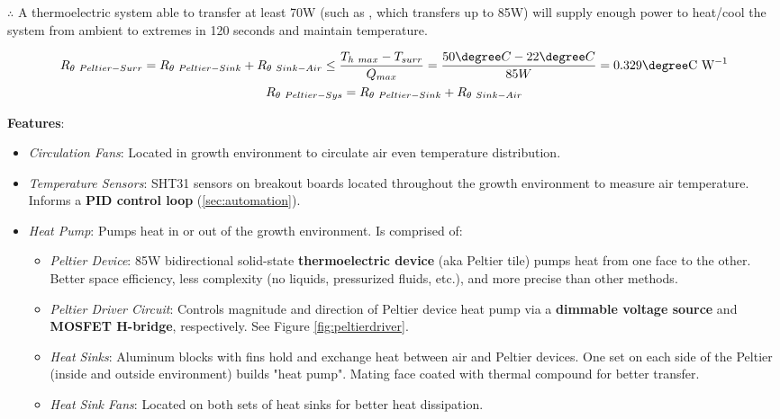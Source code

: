 $\therefore$ A thermoelectric system able to transfer at least 70W (such as \cite{peltier}, which transfers up to 85W) will supply enough power to heat/cool the system from ambient to extremes in 120 seconds and maintain temperature.

\begin{gather*}
  \label{eqn:thermalresistance-hot}
  R_{\theta~Peltier-Surr}=R_{\theta~Peltier-Sink}+R_{\theta~Sink-Air}\le\frac{T_{h~max} - T_{surr}}{Q_{max}}=\frac{50\degree C - 22\degree C}{85W}=0.329\degree \text{C W}^{-1}\\
  \label{eqn:thermalresistance-cold}
  R_{\theta~Peltier-Sys}=R_{\theta~Peltier-Sink}+R_{\theta~Sink-Air}
\end{gather*}

\textbf{Features}:
\begin{itemize}
    \item \textit{Circulation Fans}: Located in growth environment to circulate air even temperature distribution.
    \item \textit{Temperature Sensors}: SHT31 \cite{sht31} sensors on breakout boards located throughout the growth environment to measure air temperature. Informs a \textbf{PID control loop} (\ref{sec:automation}).
    \item \textit{Heat Pump}: Pumps heat in or out of the growth environment. Is comprised of:
    \begin{itemize}
        \item \textit{Peltier Device}: 85W bidirectional solid-state \textbf{thermoelectric device} (aka Peltier tile) \cite{peltier} pumps heat from one face to the other. Better space efficiency, less complexity (no liquids, pressurized fluids, etc.), and more precise than other methods.
        \item \textit{Peltier Driver Circuit}: Controls magnitude and direction of Peltier device heat pump via a \textbf{dimmable voltage source} and \textbf{MOSFET H-bridge}, respectively. See Figure \ref{fig:peltierdriver}.
        \item \textit{Heat Sinks}: Aluminum blocks with fins hold and exchange heat between air and Peltier devices. One set on each side of the Peltier (inside and outside environment) builds "heat pump". Mating face coated with thermal compound for better transfer.
        \item \textit{Heat Sink Fans}: Located on both sets of heat sinks for better heat dissipation.
    \end{itemize}
\end{itemize}

